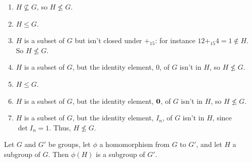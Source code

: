 \begin{solution}[print=false]
\begin{enumerate}
\item $H\not\subseteq G$, so $H\not\leq G$.
\item $H\leq G$.
\item $H$ is a subset of $G$ but isn't closed under $+_{15}$: for instance $12+_{15}4=1\not\in H$.  So $H\not\leq G$.
\item $H$ is a subset of $G$, but the identity element, 0, of $G$ isn't in $H$, so $H\not\leq G$.
\item $H\leq G$.
\item $H$ is a subset of $G$, but the identity element, $\mathbf 0$, of $G$ isn't in $H$, so $H\not\leq G$.
\item $H$ is a subset of $G$, but the identity element, $I_n$, of $G$ isn't in $H$, since $\det I_n=1$.  Thus, $H\not\leq G$.
\end{enumerate}
\end{solution}


\begin{comment}
\begin{exercise}[ID=4C]

\begin{enumerate}
\item
Draw the subgroup lattices for the groups $\Z_2 \times \Z_3$ and $\Z_2 \times \Z_4$. (Identify each subgroup in the following lattices explicitly, either by listing its elements within set brackets, or by otherwise identifying it using precise mathematical notation.)

\item Would it be reasonable for me to ask you to draw the complete subgroup lattice for $\Z$?  If so, draw it; otherwise, explain why that's an unreasonable request. \textbf{Make sure any sentences you write are grammatically correct.}

\end{enumerate}
\end{exercise}

\begin{solution}[print=false]
\end{solution}

\end{comment}

\begin{exercise}
 Let $G$ and $G'$ be groups, let $\phi$ a homomorphism from $G$ to $G'$, and let $H$ a subgroup of $G$.  Then $\phi(H)$ is a subgroup of $G'$.
 \end{exercise}

